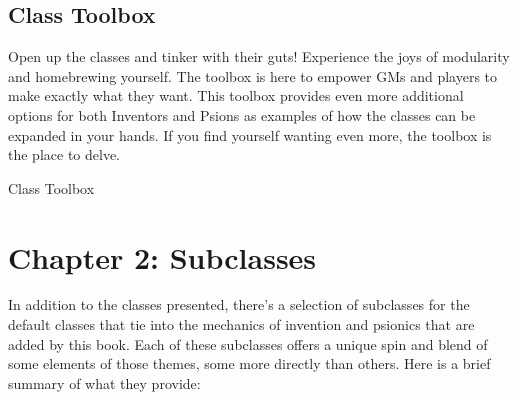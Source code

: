\documentclass[11pt,twoside,openany]{book}  %
\begin{document}
\subsection*{Class Toolbox}

Open up the classes and tinker with their guts! Experience the joys of modularity and homebrewing yourself. The toolbox is here to empower GMs and players to make exactly what they want. This toolbox provides even more additional options for both Inventors and Psions as examples of how the classes can be expanded in your hands. If you find yourself wanting even more, the toolbox is the place to delve.

\begin{fiveitemize}
	\item Class Toolbox
\end{fiveitemize}

\section*{Chapter 2: Subclasses}
In addition to the classes presented, there’s a selection of subclasses for the default classes that tie into the mechanics of invention and psionics that are added by this book. Each of these subclasses offers a unique spin and blend of some elements of those themes, some more directly than others. Here is a brief summary of what they provide:
\end{document}
